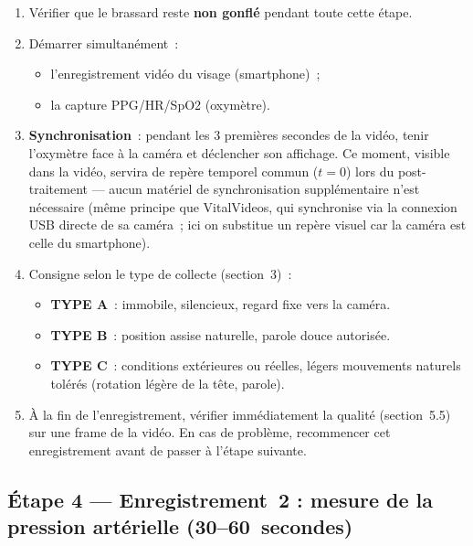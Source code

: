 \documentclass[11pt,a4paper]{article}
\begin{document}
\begin{enumerate}
\item V\'erifier que le brassard reste \textbf{non gonfl\'e} pendant toute
cette \'etape.
\item D\'emarrer simultan\'ement~:
  \begin{itemize}
  \item l'enregistrement vid\'eo du visage (smartphone)~;
  \item la capture PPG/HR/SpO2 (oxym\`etre).
  \end{itemize}
\item \textbf{Synchronisation}~: pendant les 3 premi\`eres secondes de la
vid\'eo, tenir l'oxym\`etre face \`a la cam\'era et d\'eclencher son
affichage. Ce moment, visible dans la vid\'eo, servira de rep\`ere temporel
commun ($t=0$) lors du post-traitement --- aucun mat\'eriel de
synchronisation suppl\'ementaire n'est n\'ecessaire (m\^eme principe que
VitalVideos, qui synchronise via la connexion USB directe de sa cam\'era~;
ici on substitue un rep\`ere visuel car la cam\'era est celle du
smartphone).
\item Consigne selon le type de collecte (section~3)~:
  \begin{itemize}
  \item \textbf{TYPE A}~: immobile, silencieux, regard fixe vers la
  cam\'era.
  \item \textbf{TYPE B}~: position assise naturelle, parole douce
  autoris\'ee.
  \item \textbf{TYPE C}~: conditions ext\'erieures ou r\'eelles, l\'egers
  mouvements naturels tol\'er\'es (rotation l\'eg\`ere de la t\^ete, parole).
  \end{itemize}
\item \`A la fin de l'enregistrement, v\'erifier imm\'ediatement la
qualit\'e (section~5.5) sur une frame de la vid\'eo. En cas de probl\`eme,
recommencer cet enregistrement avant de passer \`a l'\'etape suivante.
\end{enumerate}

\subsection{\'Etape 4 --- Enregistrement~2 : mesure de la pression
art\'erielle (30--60~secondes)}
\end{document}
